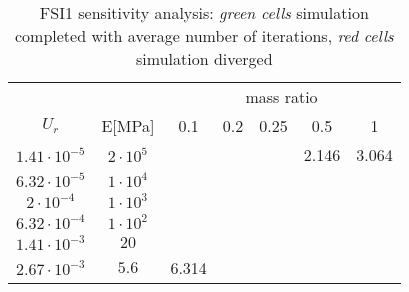 \begin{table}[!htb]
	\begin{center}
		\begin{tabular}{ c | c | c c c c c} 
         &  & \multicolumn{5}{c}{mass ratio} \\
         
        $U_r$ & E[\si{MPa}] & 0.1 & 0.2 & 0.25 & 0.5 & 1 \\
        \hline
        
        $1.41\cdot 10^{-5}$ & $2\cdot 10^{5}$ & \cellcolor{green!10} & \cellcolor{green!10} & \cellcolor{green!10} & \cellcolor{green!10}2.146 & \cellcolor{green!10}3.064 \\
        $6.32\cdot 10^{-5}$ & $1\cdot 10^{4}$ & \cellcolor{green!10} & \cellcolor{green!10} & \cellcolor{green!10} & \cellcolor{red!10} & \cellcolor{red!10} \\        
        $2\cdot 10^{-4}$ & $1\cdot 10^{3}$ & \cellcolor{green!10} & \cellcolor{green!10} & \cellcolor{green!10} & \cellcolor{red!10} & \cellcolor{red!10} \\
        $6.32\cdot 10^{-4}$ & $1\cdot 10^{2}$ & \cellcolor{green!10} & \cellcolor{green!10} & \cellcolor{green!10} & \cellcolor{red!10} & \cellcolor{red!10} \\
        $1.41\cdot 10^{-3}$ & $20$ & \cellcolor{green!10} & \cellcolor{green!10} & \cellcolor{green!10} & \cellcolor{red!10} & \cellcolor{red!10} \\
        $2.67\cdot 10^{-3}$ & $5.6$ & \cellcolor{green!10}6.314 & \cellcolor{red!10} & \cellcolor{red!10} & \cellcolor{red!10} & \cellcolor{red!10} \\                        
 		\end{tabular}
	\end{center}
	\caption{FSI1 sensitivity analysis: \textit{green cells} simulation completed with average number of iterations, \textit{red cells} simulation diverged}
	\label{table:FSI1-sens}
\end{table}